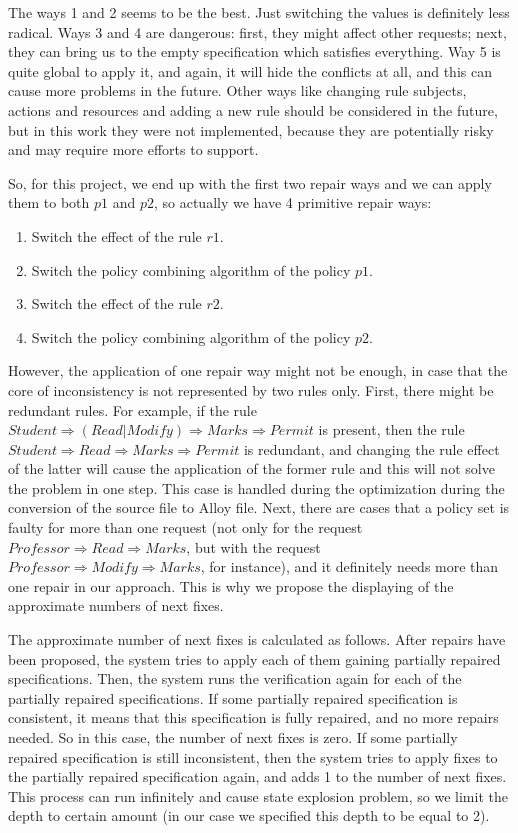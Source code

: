\documentclass[letterpaper]{acm_proc_article-sp}
\begin{document}
The ways 1 and 2 seems to be the best. Just switching the values is definitely less radical. Ways 3 and 4 are dangerous: first, they might affect other requests; next, they can bring us to the empty specification which satisfies everything. Way 5 is quite global to apply it, and again, it will hide the conflicts at all, and this can cause more problems in the future. Other ways like changing rule subjects, actions and resources and adding a new rule should be considered in the future, but in this work they were not implemented, because they are potentially risky and may require more efforts to support. 

So, for this project, we end up with the first two repair ways and we can apply them to both $p1$ and $p2$, so actually we have 4 primitive repair ways:

\begin{enumerate}
\item Switch the effect of the rule $r1$.
\item Switch the policy combining algorithm of the policy $p1$.
\item Switch the effect of the rule $r2$.
\item Switch the policy combining algorithm of the policy $p2$.
\end{enumerate}

However, the application of one repair way might not be enough, in case that the core of inconsistency is not represented by two rules only. First, there might be redundant rules. For example, if the rule $Student \Rightarrow (Read | Modify) \Rightarrow Marks \Rightarrow Permit$ is present, then the rule $Student \Rightarrow Read \Rightarrow Marks \Rightarrow Permit$ is redundant, and changing the rule effect of the latter will cause the application of the former rule and this will not solve the problem in one step. This case is handled during the optimization during the conversion of the source file to Alloy file. Next, there are cases that a policy set is faulty for more than one request (not only for the request $Professor \Rightarrow Read \Rightarrow Marks$, but with the request  $Professor \Rightarrow  Modify \Rightarrow Marks$, for instance), and it definitely needs more than one repair in our approach. This is why we propose the displaying of the approximate numbers of next fixes.

The approximate number of next fixes is calculated as follows. After repairs have been proposed, the system tries to apply each of them gaining partially repaired specifications. Then, the system runs the verification again for each of the partially repaired specifications. If some partially repaired specification is consistent, it means that this specification is fully repaired, and no more repairs needed. So in this case, the number of next fixes is zero. If some partially repaired specification is still inconsistent, then the system tries to apply fixes to the partially repaired specification again, and adds 1 to the number of next fixes. This process can run infinitely and cause state explosion problem, so we limit the depth to certain amount (in our case we specified this depth to be equal to 2).
\end{document}
